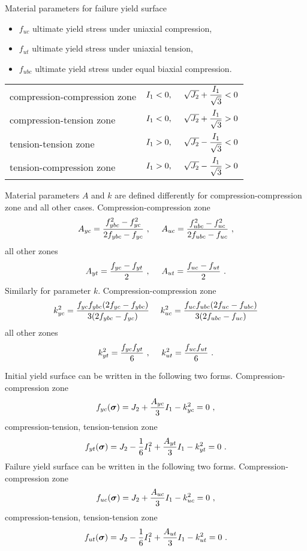 Material parameters for failure yield surface
\begin{itemize}
\item $f_{uc}$  ultimate yield stress under uniaxial compression,
\item $f_{ut}$  ultimate yield stress under uniaxial tension,
\item $f_{ubc}$ ultimate yield stress under equal biaxial compression.
\end{itemize}

\begin{tabular}{ll}
compression-compression zone & $I_1<0,\ \ \ \ \sqrt{J_2}+\del{I_1}{\sqrt{3}}<0$
\\[2mm]
compression-tension zone     & $I_1<0,\ \ \ \ \sqrt{J_2}+\del{I_1}{\sqrt{3}}>0$
\\[2mm]
tension-tension zone         & $I_1>0,\ \ \ \ \sqrt{J_2}-\del{I_1}{\sqrt{3}}<0$
\\[2mm]
tension-compression zone     & $I_1>0,\ \ \ \ \sqrt{J_2}-\del{I_1}{\sqrt{3}}>0$
\\
\end{tabular}

Material parameters $A$ and $k$ are defined differently for compression-compression
zone and all other cases. Compression-compression zone
\begin{equation}
A_{yc} = \mbox{$\displaystyle\frac{f_{ybc}^2 - f_{yc}^2}{2f_{ybc}-f_{yc}}$}\ ,
\ \ \ \
A_{uc} = \mbox{$\displaystyle\frac{f_{ubc}^2 - f_{uc}^2}{2f_{ubc}-f_{uc}}$}\ ,
\end{equation}
all other zones
\begin{equation}
A_{yt} = \mbox{$\displaystyle\frac{f_{yc} - f_{yt}}{2}$}\ ,
\ \ \ \
A_{ut} = \mbox{$\displaystyle\frac{f_{uc} - f_{ut}}{2}$}\ .
\end{equation}
Similarly for parameter $k$. Compression-compression zone
\begin{equation}
k^2_{yc} = \del{f_{yc} f_{ybc} (2f_{yc}-f_{ybc})}{3(2f_{ybc}-f_{yc})}
\ \ \ \ 
k^2_{uc} = \del{f_{uc} f_{ubc} (2f_{uc}-f_{ubc})}{3(2f_{ubc}-f_{uc})}
\end{equation}
all other zones
\begin{equation}
k^2_{yt} = \mbox{$\displaystyle\frac{f_{yc} f_{yt}}{6}$}\ ,
\ \ \ \
k^2_{ut} = \mbox{$\displaystyle\frac{f_{uc} f_{ut}}{6}$}\ .
\end{equation}

Initial yield surface can be written in the following two forms.
Compression-compression zone
\begin{equation}
f_{yc} (\mbox{\boldmath$\sigma$}) = J_2 + \mbox{$\displaystyle\frac{A_{yc}}{3}$} I_1 - k^2_{yc} = 0\ ,
\end{equation}
compression-tension, tension-tension zone
\begin{equation}
f_{yt} (\mbox{\boldmath$\sigma$}) = J_2 -\mbox{$\displaystyle\frac{1}{6}$}I_1^2 + \mbox{$\displaystyle\frac{A_{yt}}{3}$} I_1 - k^2_{yt} = 0\ .
\end{equation}
Failure yield surface can be written in the following two forms.
Compression-compression zone
\begin{equation}
f_{uc} (\mbox{\boldmath$\sigma$}) = J_2 + \mbox{$\displaystyle\frac{A_{uc}}{3}$} I_1 - k^2_{uc} = 0\ ,
\end{equation}
compression-tension, tension-tension zone
\begin{equation}
f_{ut} (\mbf{\sigma}) = J_2 -\del{1}{6}I_1^2 + \del{A_{ut}}{3} I_1 - k^2_{ut} = 0\ .
\end{equation}

